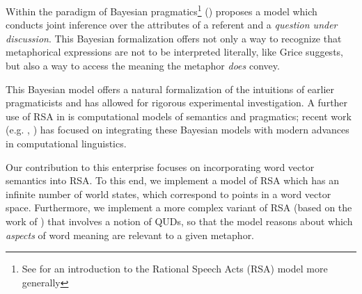 \documentclass[10pt,letterpaper,twocolumn]{article}
\begin{document}




Within the paradigm of Bayesian pragmatics\footnote{See \cite{frank2012predicting} for an introduction to the Rational Speech Acts (RSA) model more generally} (\cite{kao}) proposes a model which conducts joint inference over the attributes of a referent and a \emph{question under discussion}. This Bayesian formalization offers not only a way to recognize that metaphorical expressions are not to be interpreted literally, like Grice suggests, but also a way to access the meaning the metaphor \emph{does} convey.

		

This Bayesian model offers a natural formalization of the intuitions of earlier pragmaticists and has allowed for rigorous experimental investigation. A further use of RSA in is computational models of semantics and pragmatics; recent work (e.g. \cite{andreas}, \cite{monroe2015learning}) has focused on integrating these Bayesian models with modern advances in computational linguistics.

Our contribution to this enterprise focuses on incorporating word vector semantics into RSA. To this end, we implement a model of RSA which has an infinite number of world states, which correspond to points in a word vector space. Furthermore, we implement a more complex variant of RSA (based on the work of \cite{kao}) that involves a notion of QUDs, so that the model reasons about which \emph{aspects} of word meaning are relevant to a given metaphor.






\end{document}
